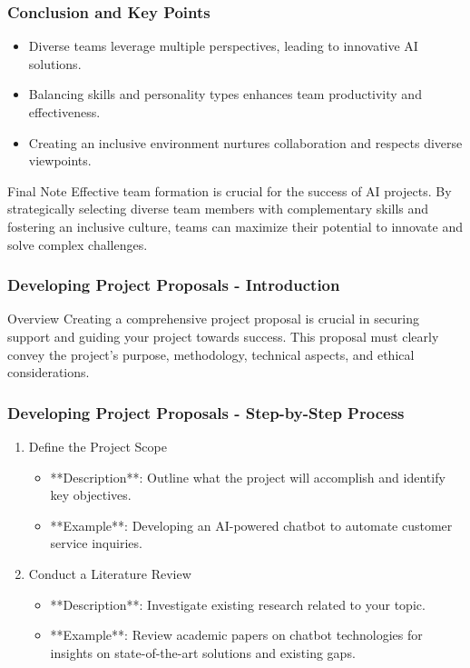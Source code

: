 \documentclass[aspectratio=169]{beamer}
\begin{document}
\begin{frame}[fragile]
    \frametitle{Conclusion and Key Points}

    \begin{itemize}
        \item Diverse teams leverage multiple perspectives, leading to innovative AI solutions.
        \item Balancing skills and personality types enhances team productivity and effectiveness.
        \item Creating an inclusive environment nurtures collaboration and respects diverse viewpoints.
    \end{itemize}
    
    \begin{block}{Final Note}
        Effective team formation is crucial for the success of AI projects. By strategically selecting diverse team members with complementary skills and fostering an inclusive culture, teams can maximize their potential to innovate and solve complex challenges.
    \end{block}
\end{frame}

\begin{frame}[fragile]
    \frametitle{Developing Project Proposals - Introduction}
    \begin{block}{Overview}
        Creating a comprehensive project proposal is crucial in securing support and guiding your project towards success. This proposal must clearly convey the project's purpose, methodology, technical aspects, and ethical considerations.
    \end{block}
\end{frame}

\begin{frame}[fragile]
    \frametitle{Developing Project Proposals - Step-by-Step Process}
    \begin{enumerate}
        \item Define the Project Scope
        \begin{itemize}
            \item **Description**: Outline what the project will accomplish and identify key objectives.
            \item **Example**: Developing an AI-powered chatbot to automate customer service inquiries.
        \end{itemize}
        
        \item Conduct a Literature Review
        \begin{itemize}
            \item **Description**: Investigate existing research related to your topic.
            \item **Example**: Review academic papers on chatbot technologies for insights on state-of-the-art solutions and existing gaps.
        \end{itemize}
    \end{enumerate}
\end{frame}
\end{document}

